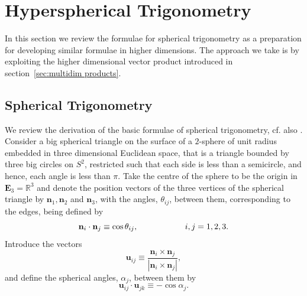 \documentclass[fleqn,11pt,twoside]{article}
\theoremstyle{definition}
\begin{document}
\section{Hyperspherical Trigonometry}

In  this section we review the formulae for spherical trigonometry as a preparation for developing similar formulae in higher dimensions. The approach we take is by exploiting the higher dimensional vector product introduced in section~\ref{sec:multidim products}.
\subsection{Spherical Trigonometry}
We review the derivation of the basic formulae of spherical trigonometry, cf. also \cite{1}. Consider a big spherical triangle on the surface of a $2$-sphere of unit radius embedded in three dimensional Euclidean space, that is a triangle bounded by three big circles on $S^2$, restricted such that each side is less than a semicircle, and hence, each angle is less than $\pi$. Take the centre of the sphere to be the origin in $\mathbf{E}_3=\mathbb{R}^3$ and denote the position vectors of the three vertices of the spherical triangle by $\mathbf{n}_1,\mathbf{n}_2$ and $\mathbf{n}_3$, with the angles, $\theta_{ij}$, between them, corresponding to the edges, being defined by
\begin{equation}
\mathbf{n}_i\cdot\textbf{n}_j\equiv\cos\theta_{ij},\hspace{20 mm}i,j=1,2,3.
\end{equation}
Introduce the vectors
\begin{equation}
\textbf{u}_{ij}\equiv\frac
{\textbf{n}_i\times\textbf{n}_j}
{\left|\textbf{n}_i\times\textbf{n}_j\right|},
\end{equation}
and define the spherical angles, $\alpha_j$, between them by
\begin{equation}
\textbf{u}_{ij}\cdot\textbf{u}_{jk}\equiv-\cos\alpha_{j}.
\end{equation}
\end{document}
